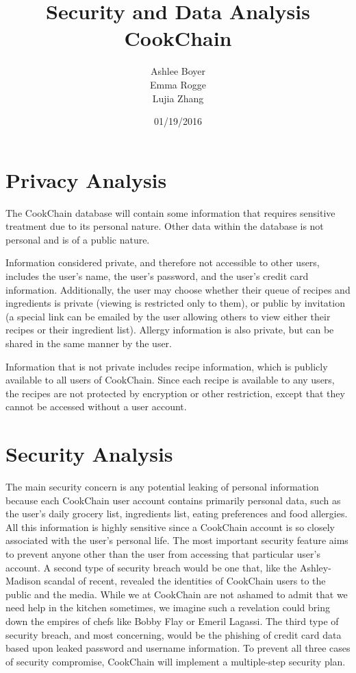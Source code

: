 \documentclass{article}
\title{\textbf{Security and Data Analysis  \\ CookChain}}
\author{Ashlee Boyer \\Emma Rogge \\ Lujia Zhang}
\date{01/19/2016}
\begin{document}
\maketitle
\renewcommand*\contentsname{Table of Contents} 
\newpage
\tableofcontents
\clearpage
\section{Privacy Analysis}
The CookChain database will contain some information that requires sensitive treatment due to its personal nature. Other data within the database is not personal and is of a public nature. 

Information considered private, and therefore not accessible to other users, includes the user's name, the user's password, and the user's credit card information. Additionally, the user may choose whether their queue of recipes and ingredients is private (viewing is restricted only to them), or public by invitation (a special link can be emailed by the user allowing others to view either their recipes or their ingredient list). Allergy information is also private, but can be shared in the same manner by the user.

Information that is not private includes recipe information, which is publicly available to all users of CookChain. Since each recipe is available to any users, the recipes are not protected by encryption or other restriction, except that they cannot be accessed without a user account. 
\section{Security Analysis}
The main security concern is any potential leaking of personal information because each CookChain user account contains primarily personal data, such as the user's daily grocery list, ingredients list, eating preferences and food allergies. All this information is highly sensitive since a CookChain account is so closely associated with the user's personal life. The most important security feature aims to prevent anyone other than the user from accessing that particular user's account. A second type of security breach would be one that, like the Ashley-Madison scandal of recent, revealed the identities of CookChain users to the public and the media. While we at CookChain are not ashamed to admit that we need help in the kitchen sometimes, we imagine such a revelation could bring down the empires of chefs like Bobby Flay or Emeril Lagassi. The third type of security breach, and most concerning, would be the phishing of credit card data based upon leaked password and username information. To prevent all three cases of security compromise, CookChain will implement a multiple-step security plan.
\end{document}
